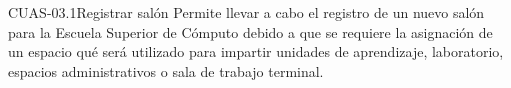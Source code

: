 \begin{UseCase}{CUAS-03.1}{Registrar salón}{
	Permite llevar a cabo el registro de un nuevo salón para la Escuela Superior de Cómputo debido a que se requiere la asignación de un espacio qué será utilizado para impartir unidades de aprendizaje, laboratorio, espacios administrativos o sala de trabajo terminal. \\
    }


%			


\end{UseCase}
